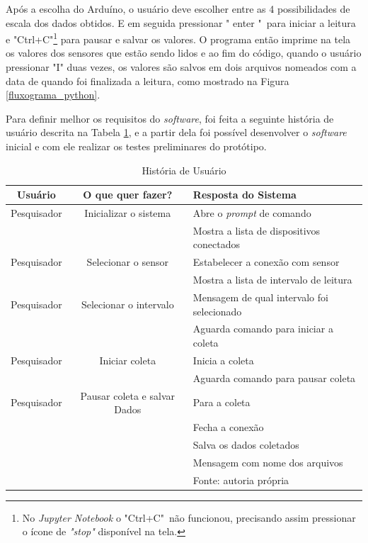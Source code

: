 		Após a escolha do Arduíno, o usuário deve escolher entre as 4 possibilidades de escala dos dados obtidos. E em seguida pressionar " enter "\ para iniciar a leitura e "Ctrl+C"\footnote{No \textit{Jupyter Notebook} o "Ctrl+C"\ não funcionou, precisando assim pressionar o ícone de \textit{"stop"} disponível na tela.} para pausar e salvar os valores. O programa então imprime na tela os valores dos sensores que estão sendo lidos e ao fim do código, quando o usuário pressionar "I" duas vezes, os valores são salvos em dois arquivos nomeados com a data de quando foi finalizada a leitura, como mostrado na Figura \ref{fluxograma_python}.
		
		Para definir melhor os requisitos do \textit{software}, foi feita a seguinte história de usuário descrita na Tabela \ref{User_story}, e a partir dela foi possível desenvolver o \textit{software} inicial e com ele realizar os testes preliminares do protótipo.
		
			\begin{table}[h] \footnotesize
			\centering
			\caption{História de Usuário}
			\label{User_story}
			
			\begin{tabular}{ccl}
				\toprule
				\textbf{Usuário} & \textbf{O que quer fazer?} & \textbf{Resposta do Sistema} \\
				\midrule
				Pesquisador & Inicializar o sistema &  Abre o \textit{prompt} de comando \\
				 & & Mostra a lista de dispositivos conectados \\
				Pesquisador & Selecionar o sensor & Estabelecer a conexão com sensor \\
				& & Mostra a lista de intervalo de leitura\\
				Pesquisador & Selecionar o intervalo & Mensagem de qual intervalo foi selecionado\\
				& & Aguarda comando para iniciar a coleta\\
				Pesquisador & Iniciar coleta & Inicia a coleta\\
				& &  Aguarda comando para pausar coleta\\
				Pesquisador & Pausar coleta e salvar Dados & Para a coleta\\
				& & Fecha a conexão\\
				& & Salva os dados coletados\\
				& & Mensagem com nome dos arquivos\\  
 				
				\bottomrule
				 & & Fonte: autoria própria
			\end{tabular}
		\end{table}
		
